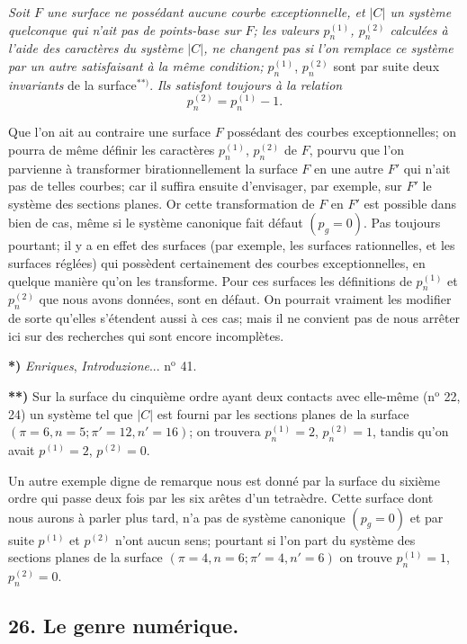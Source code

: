 \documentclass{article}
\begin{document}
\emph{Soit $F$ une surface ne possédant aucune courbe exceptionnelle, et $|C|$ un système quelconque qui n'ait pas de points-base sur $F$; les valeurs $p_{n}^{(1)}$, $p_{n}^{(2)}$ calculées à l'aide des caractères du système $|C|$, ne changent pas si l'on remplace ce système par un autre satisfaisant à la même condition;} $p_{n}^{(1)}$, $p_{n}^{(2)}$ sont par suite deux \emph{invariants} de la surface${}^{**)}$. \emph{Ils satisfont toujours à la relation}
\[
p_{n}^{(2)} = p_{n}^{(1)} - 1.
\]

Que l'on ait au contraire une surface $F$ possédant des courbes exceptionnelles; on pourra de même définir les caractères $p_{n}^{(1)}$, $p_{n}^{(2)}$ de $F$, pourvu que l'on parvienne à transformer birationnellement la surface $F$ en une autre $F'$ qui n'ait pas de telles courbes; car il suffira ensuite d'envisager, par exemple, sur $F'$ le système des sections planes. Or cette transformation de $F$ en $F'$ est possible dans bien de cas, même si le système canonique fait défaut $(p_{g} = 0)$. Pas toujours pourtant; il y a en effet des surfaces (par exemple, les surfaces rationnelles, et les surfaces réglées) qui possèdent certainement des courbes exceptionnelles, en quelque manière qu'on les transforme. Pour ces surfaces les définitions de $p_{n}^{(1)}$ et $p_{n}^{(2)}$ que nous avons données, sont en défaut. On pourrait vraiment les modifier de sorte qu'elles s'étendent aussi à ces cas; mais il ne convient pas de nous arrêter ici sur des recherches qui sont encore incomplètes.

\textbf{*)} \emph{Enriques}, \emph{Introduzione}... n${}^{\text{o}}$ 41.

\textbf{**)} Sur la surface du cinquième ordre ayant deux contacts avec elle-même (n${}^{\text{o}}$ 22, 24) un système tel que $|C|$ est fourni par les sections planes de la surface $(\pi = 6, n = 5; \pi' = 12, n' = 16)$; on trouvera $p_{n}^{(1)} = 2$, $p_{n}^{(2)} = 1$, tandis qu'on avait $p^{(1)} = 2$, $p^{(2)} = 0$.

Un autre exemple digne de remarque nous est donné par la surface du sixième ordre qui passe deux fois par les six arêtes d'un tetraèdre. Cette surface dont nous aurons à parler plus tard, n'a pas de système canonique $(p_{g} = 0)$ et par suite $p^{(1)}$ et $p^{(2)}$ n'ont aucun sens; pourtant si l'on part du système des sections planes de la surface $(\pi = 4, n = 6; \pi' = 4, n' = 6)$ on trouve $p_{n}^{(1)} = 1$, $p_{n}^{(2)} = 0$.


\subsection*{26. Le genre numérique.}
\end{document}
